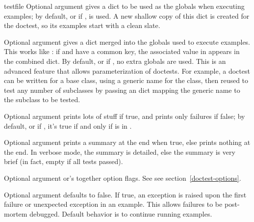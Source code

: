 \begin{funcdesc}{testfile}
  Optional argument  gives a dict to be used as the globals
  when executing examples; by default, or if ,
   is used.  A new shallow copy of this dict is
  created for the doctest, so its examples start with a clean slate.

  Optional argument  gives a dict merged into the
  globals used to execute examples.  This works like
  :  if  and  have a
  common key, the associated value in  appears in the
  combined dict.  By default, or if , no extra globals are
  used.  This is an advanced feature that allows parameterization of
  doctests.  For example, a doctest can be written for a base class, using
  a generic name for the class, then reused to test any number of
  subclasses by passing an  dict mapping the generic
  name to the subclass to be tested.

  Optional argument  prints lots of stuff if true, and prints
  only failures if false; by default, or if , it's true
  if and only if  is in .

  Optional argument  prints a summary at the end when true,
  else prints nothing at the end.  In verbose mode, the summary is
  detailed, else the summary is very brief (in fact, empty if all tests
  passed).

  Optional argument  or's together option flags.  See
  see section~\ref{doctest-options}.

  Optional argument  defaults to false.  If true,
  an exception is raised upon the first failure or unexpected exception
  in an example.  This allows failures to be post-mortem debugged.
  Default behavior is to continue running examples.

\end{funcdesc}

